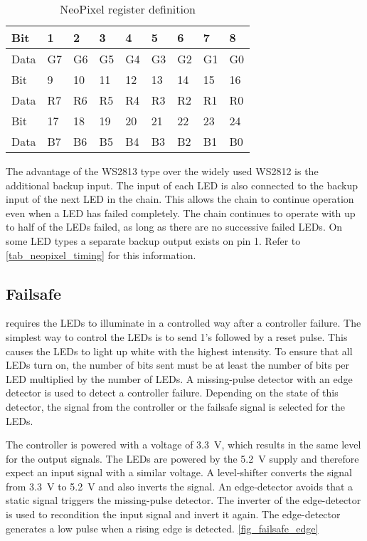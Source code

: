 \begin{table}[h!]
    \centering
    \begin{tabular}{|l|l|l|l|l|l|l|l|l|}
        \hline
        Bit     & 1  & 2  & 3  & 4  & 5  & 6  & 7  & 8  \\
        \hline
        Data    & G7 & G6 & G5 & G4 & G3 & G2 & G1 & G0 \\
        \hline
        \hline
        Bit     & 9  & 10 & 11 & 12 & 13 & 14 & 15 & 16 \\
        \hline
        Data    & R7 & R6 & R5 & R4 & R3 & R2 & R1 & R0 \\
        \hline
        \hline
        Bit     & 17 & 18 & 19 & 20 & 21 & 22 & 23 & 24 \\
        \hline
        Data    & B7 & B6 & B5 & B4 & B3 & B2 & B1 & B0 \\ 
        \hline
    \end{tabular}
    \caption{NeoPixel register definition}
    \label{tab_neopixel_register}
\end{table}

The advantage of the WS2813 type over the widely used WS2812 is the additional backup input. The input of each \ac{LED} is also connected to the backup input of the next \ac{LED} in the chain. This allows the chain to continue operation even when a \ac{LED} has failed completely. The chain continues to operate with up to half of the \acp{LED} failed, as long as there are no successive failed \acp{LED}. On some \ac{LED} types a separate backup output exists on pin 1. Refer to \autoref{tab_neopixel_timing} for this information. 

\subsection{Failsafe}
\label{sec_failsafe}
 requires the \acp{LED} to illuminate in a controlled way after a controller failure. The simplest way to control the \acp{LED} is to send 1's followed by a reset pulse. This causes the \acp{LED} to light up white with the highest intensity. To ensure that all \acp{LED} turn on, the number of bits sent must be at least the number of bits per \ac{LED} multiplied by the number of \acp{LED}. A missing-pulse detector with an edge detector is used to detect a controller failure. Depending on the state of this detector, the signal from the controller or the failsafe signal is selected for the \acp{LED}. 

The controller is powered with a voltage of \SI{3.3}{\volt}, which results in the same level for the output signals. The \acp{LED} are powered by the \SI{5.2}{\volt} supply and therefore expect an input signal with a similar voltage. A level-shifter converts the signal from \SI{3.3}{\volt} to \SI{5.2}{\volt} and also inverts the signal. An edge-detector avoids that a static signal triggers the missing-pulse detector. The inverter of the edge-detector is used to recondition the input signal and invert it again. The edge-detector generates a low pulse when a rising edge is detected. \autoref{fig_failsafe_edge}

